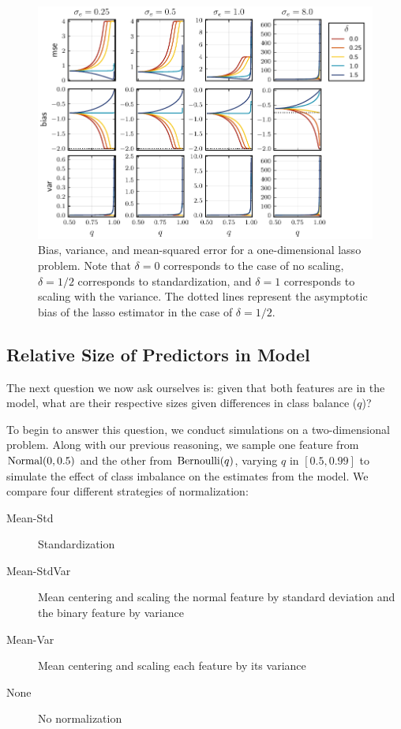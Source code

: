 \begin{figure}[htpb]
  \centering
  \includegraphics[]{plots/bias-var-onedim.pdf}
  \caption{%
    Bias, variance, and mean-squared error for a one-dimensional lasso problem.
    Note that \(\delta = 0\) corresponds to the case of no scaling, \(\delta = 1/2\) corresponds
    to standardization, and \(\delta = 1\) corresponds to scaling with the variance. The dotted
    lines represent the asymptotic bias of the lasso estimator in the case of \(\delta = 1/2\).
  }
  \label{fig:bias-var-onedim-lasso}
\end{figure}

\subsection{Relative Size of Predictors in Model}

The next question we now ask ourselves is: given that both features are in the model, what are their respective sizes given differences in class balance (\(q\))?

To begin to answer this question, we conduct simulations on a two-dimensional problem. Along with our previous reasoning, we sample one feature from \(\operatorname{Normal}(0, 0.5)\) and the other from \(\operatorname{Bernoulli}(q)\), varying \(q\) in \([0.5, 0.99]\) to simulate the effect of class imbalance on the estimates from the model. We compare four different strategies of normalization:
\begin{description}
  \item[Mean-Std] Standardization
  \item[Mean-StdVar] Mean centering and scaling the normal feature by standard deviation and the binary feature by variance
  \item[Mean-Var] Mean centering and scaling each feature by its variance
  \item[None] No normalization
\end{description}

